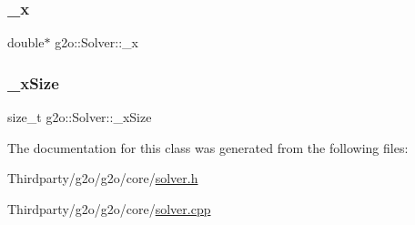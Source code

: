 \subsubsection{\texorpdfstring{\+\_\+x}{\_x}}
{\footnotesize\ttfamily double$\ast$ g2o\+::\+Solver\+::\+\_\+x\hspace{0.3cm}{\ttfamily [protected]}}

\mbox{\label{classg2o_1_1_solver_abcf7731347f14915bd9ba963021ea830}} 
\subsubsection{\texorpdfstring{\+\_\+x\+Size}{\_xSize}}
{\footnotesize\ttfamily size\+\_\+t g2o\+::\+Solver\+::\+\_\+x\+Size\hspace{0.3cm}{\ttfamily [protected]}}



The documentation for this class was generated from the following files\+:\begin{DoxyCompactItemize}
\item 
Thirdparty/g2o/g2o/core/\mbox{\hyperlink{solver_8h}{solver.\+h}}\item 
Thirdparty/g2o/g2o/core/\mbox{\hyperlink{solver_8cpp}{solver.\+cpp}}\end{DoxyCompactItemize}
